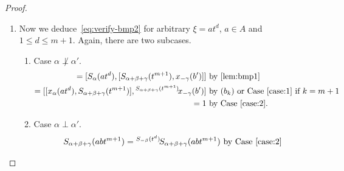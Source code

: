 \documentclass[oneside, 10pt]{amsart}
\numberwithin{equation}{section}
\numberwithin{lemma}{section}
\theoremstyle{definition}
\theoremstyle{remark}
\begin{document}
\begin{proof}
\begin{enumerate}
\begin{enumerate}
 \item Case $\alpha\perp\alpha'$. As before, we may assume $\alpha'=\gamma$.
\begin{align*}
{}^{S_\gamma(t^d)}S_\alpha(bt^{m+1}) = {}^{S_\gamma(t^d)}[S_{-\beta}(b't^{m+1}), x_{\alpha+\beta}(1)] & \text{ by~\cref{lem:bmp1}}\\
 = [S_{-\beta}(b't^{m+1}), {}^{S_\gamma(t^d)}x_{\alpha+\beta}(1)]                                     & \text{ by Case~\eqref{case:2a} since $\gamma\not\perp-\beta$}\\
 = [[x_{-\beta-\gamma}(b''t^{m+1-d}), S_\gamma(t^d)], {}^{S_\gamma(t^d)}x_{\alpha+\beta}(1)]          & \text{ by~\eqref{eq:verify-bmp1'}}\\
 = [x_{-\beta-\gamma}(b''t^{m+1-d)}), [S_\gamma(t^d), x_{\alpha+\beta}(1)]]                           & \text{ by~\eqref{eq:H1iii} and~\eqref{eq:bm} since $m+1-d \leq m$}\\
 = S_{\alpha}(b'''t^{m+1})                                                                            & \text{ by~\eqref{eq:verify-bmp1'}} \end{align*}
 Usual identities for structure constants imply (cf.~\cite[p.~12]{Re75}):
 \[b'''=N_{-\beta-\gamma, \alpha+\beta+\gamma} \cdot N_{\gamma, \alpha+\beta} \cdot N_{-\beta-\gamma, \gamma} \cdot N_{-\beta, \alpha+\beta} \cdot b = b, \] 
\end{enumerate}
This finishes the proof of~\eqref{eq:verify-bmp2} in the special case $a=1$.
\item Now we deduce~\eqref{eq:verify-bmp2} for arbitrary $\xi = at^d$, $a\in A$ and $1\leq d\leq m+1$. Again, there are two subcases.
\begin{enumerate}
\item \label{case:3a} Case $\alpha \not\perp \alpha'$. %
 \begin{align*} 
 [S_\alpha(at^d), S_{\alpha + \beta}(bt^{m+1})] = 
 [S_\alpha(at^d), [S_{\alpha+\beta+\gamma}(t^{m+1}), x_{-\gamma}(b')]] & \text{ by~\cref{lem:bmp1}} \\
  = [[x_\alpha(at^d), S_{\alpha+\beta+\gamma}(t^{m+1})], {}^{S_{\alpha+\beta+\gamma}(t^{m+1})}\!x_{-\gamma}(b')] & \text{ by $(b_k)$ or Case~\eqref{case:1} if $k=m+1$} \\
  = 1 & \text{ by Case~\eqref{case:2}.} \end{align*}
\item Case $\alpha \perp \alpha'$.
\begin{align*}
 S_{\alpha+\beta+\gamma}(abt^{m+1}) = {}^{S_{-\beta}(t^d)}\!S_{\alpha+\beta+\gamma}(abt^{m+1}) & \text{ by Case~\eqref{case:2}}\\

\end{align*}
\end{enumerate}
\end{enumerate}
\end{proof}
\end{document}
